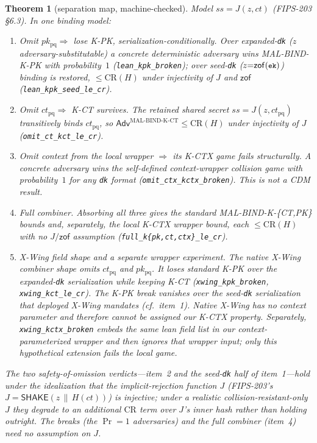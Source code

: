 \documentclass[journal]{IEEEtran}
\newtheorem{theorem}{Theorem}
\newcommand{\code}[1]{\texttt{\small #1}}
\begin{document}
\begin{theorem}[separation map, machine-checked]\label{thm:sep}
Model $ss=J(z,ct)$ (FIPS-203 \S6.3). In one binding model:
\begin{enumerate}\itemsep1pt
\item \emph{Omit $pk_{\mathrm{pq}}\Rightarrow$ lose \mbox{K-PK}, serialization-conditionally.} Over
expanded-\code{dk} ($z$ adversary-substitutable) a concrete deterministic adversary wins
\mbox{MAL-BIND-K-PK} with probability~$1$ (\code{lean\_kpk\_broken}); over seed-\code{dk}
($z{=}\mathsf{zof}(\code{ek})$) binding is restored, $\le\mathrm{CR}(H)$ under injectivity of $J$ and
$\mathsf{zof}$ (\code{lean\_kpk\_seed\_le\_cr}).
\item \emph{Omit $ct_{\mathrm{pq}}\Rightarrow$ \mbox{K-CT} survives.} The retained shared secret
$ss{=}J(z,ct_{\mathrm{pq}})$ transitively binds $ct_{\mathrm{pq}}$, so
$\mathsf{Adv}^{\text{MAL-BIND-K-CT}}\le\mathrm{CR}(H)$ under injectivity of $J$
(\code{omit\_ct\_kct\_le\_cr}).
\item \emph{Omit context from the local wrapper $\Rightarrow$ its K-CTX game fails structurally.}
A concrete adversary wins the self-defined context-wrapper collision game with probability~$1$ for
\emph{any} \code{dk} format (\code{omit\_ctx\_kctx\_broken}). This is not a CDM result.
\item \emph{Full combiner.} Absorbing all three gives the standard
\mbox{MAL-BIND-K-\{CT,PK\}} bounds and, separately, the local K-CTX wrapper bound,
each $\le\mathrm{CR}(H)$ with \emph{no} $J/\mathsf{zof}$ assumption
(\code{full\_k\{pk,ct,ctx\}\_le\_cr}).
\item \emph{X-Wing field shape and a separate wrapper experiment.} The native X-Wing
\emph{combiner shape} omits $ct_{\mathrm{pq}}$ and $pk_{\mathrm{pq}}$. It loses standard
\mbox{K-PK} \emph{over the expanded-\code{dk} serialization} while keeping
\mbox{K-CT} (\code{xwing\_kpk\_broken}, \code{xwing\_kct\_le\_cr}). The K-PK break vanishes
over the seed-\code{dk} serialization that deployed X-Wing mandates (cf.\ item~1). Native X-Wing
has no context parameter and therefore cannot be assigned our K-CTX property. Separately,
\code{xwing\_kctx\_broken} embeds the same lean field list in our context-parameterized wrapper
and then ignores that wrapper input; only this hypothetical extension fails the local game.
\end{enumerate}
The two \emph{safety-of-omission} verdicts---item~2 and the seed-\code{dk} half of item~1---hold under
the idealization that the implicit-rejection function $J$ (FIPS-203's $J{=}\mathsf{SHAKE}(z\,\|\,
H(ct))$) is \emph{injective}; under a realistic collision-resistant-only $J$ they degrade to an
additional $\mathrm{CR}$ term over $J$'s inner hash rather than holding outright. The breaks (the
$\Pr{=}1$ adversaries) and the full combiner (item~4) need \emph{no} assumption on $J$.
\end{theorem}
\end{document}
